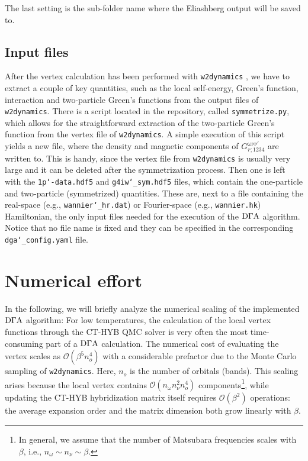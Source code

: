 \documentclass[../../main.tex]{subfiles}
\begin{document}
The last setting is the sub-folder name where the Eliashberg output will be saved to.
 
\subsection{Input files}

After the vertex calculation has been performed with \texttt{w2dynamics} \cite{Wallerberger2019}, we have to extract a couple of key quantities, such as the local self-energy, Green's function, interaction and two-particle Green's functions from the output files of \texttt{w2dynamics}. There is a script located in the repository, called \texttt{symmetrize.py}, which allows for the straightforward extraction of the two-particle Green's function from the vertex file of \texttt{w2dynamics}. A simple execution of this script yields a new file, where the density and magnetic components of $G^{\omega\nu\nu'}_{r;\mathfrak{1234}}$ are written to. This is handy, since the vertex file from \texttt{w2dynamics} is usually very large and it can be deleted after the symmetrization process. Then one is left with the \texttt{1p\char`-data.hdf5} and \texttt{g4iw\char`_sym.hdf5} files, which contain the one-particle and two-particle (symmetrized) quantities. These are, next to a file containing the real-space (e.g., \texttt{wannier\char`_hr.dat}) or Fourier-space (e.g., \texttt{wannier.hk}) Hamiltonian, the only input files needed for the execution of the $\text{D}\Gamma\text{A}$ algorithm. Notice that no file name is fixed and they can be specified in the corresponding \texttt{dga\char`_config.yaml} file.

\section{Numerical effort}

In the following, we will briefly analyze the numerical scaling of the implemented $\text{D}\Gamma\text{A}$ algorithm: For low temperatures, the calculation of the local vertex functions through the CT-HYB QMC solver is very often the most time-consuming part of a $\text{D}\Gamma\text{A}$ calculation. The numerical cost of evaluating the vertex scales as $\mathcal{O}(\beta^5 n_{o}^4)$ with a considerable prefactor due to the Monte Carlo sampling of \texttt{w2dynamics}. Here, $n_{o}$ is the number of orbitals (bands). This scaling arises because the local vertex contains $\mathcal{O}(n_{\omega}n_{\nu}^2n_{o}^4)$ components\footnote{In general, we assume that the number of Matsubara frequencies scales with $\beta$, i.e., $n_{\omega}\sim n_{\nu}\sim\beta$.}, while updating the CT-HYB hybridization matrix itself requires $\mathcal{O}(\beta^2)$ operations: the average expansion order and the matrix dimension both grow linearly with $\beta$.
\end{document}
